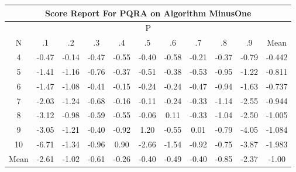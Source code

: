 \documentclass[11pt,a4paper]{report}
\begin{document}
\begin{longtable}{ | c || c | c | c | c | c | c | c | c | c || c |}
\hline
\multicolumn{11}{|c|}{ Score Report For PQRA on Algorithm MinusOne} \\
\hline
\multicolumn{11}{|c|}{ P } \\
\hline
N & .1 & .2 & .3 & .4 & .5 & .6 & .7 & .8 & .9 & Mean\\
 \hline
 \hline
 \endhead
  4 &  \cellcolor[HTML]{FFF7F7} -0.47 &  \cellcolor[HTML]{FFFFFF} -0.14 &  \cellcolor[HTML]{FFF7F7} -0.47 &  \cellcolor[HTML]{FFEFEF} -0.55 &  \cellcolor[HTML]{FFF7F7} -0.40 &  \cellcolor[HTML]{FFEFEF} -0.58 &  \cellcolor[HTML]{FFF7F7} -0.21 &  \cellcolor[HTML]{FFF7F7} -0.37 &  \cellcolor[HTML]{FFEFEF} -0.79 & -0.442 \\
  5 &  \cellcolor[HTML]{FFDFDF} -1.41 &  \cellcolor[HTML]{FFDFDF} -1.16 &  \cellcolor[HTML]{FFEFEF} -0.76 &  \cellcolor[HTML]{FFF7F7} -0.37 &  \cellcolor[HTML]{FFEFEF} -0.51 &  \cellcolor[HTML]{FFF7F7} -0.38 &  \cellcolor[HTML]{FFEFEF} -0.53 &  \cellcolor[HTML]{FFE7E7} -0.95 &  \cellcolor[HTML]{FFDFDF} -1.22 & -0.811 \\
  6 &  \cellcolor[HTML]{FFD7D7} -1.47 &  \cellcolor[HTML]{FFE7E7} -1.08 &  \cellcolor[HTML]{FFF7F7} -0.41 &  \cellcolor[HTML]{FFFFFF} -0.15 &  \cellcolor[HTML]{FFF7F7} -0.24 &  \cellcolor[HTML]{FFF7F7} -0.24 &  \cellcolor[HTML]{FFF7F7} -0.47 &  \cellcolor[HTML]{FFE7E7} -0.94 &  \cellcolor[HTML]{FFD7D7} -1.63 & -0.737 \\
  7 &  \cellcolor[HTML]{FFCFCF} -2.03 &  \cellcolor[HTML]{FFDFDF} -1.24 &  \cellcolor[HTML]{FFEFEF} -0.68 &  \cellcolor[HTML]{FFF7F7} -0.16 &  \cellcolor[HTML]{FFFFFF} -0.11 &  \cellcolor[HTML]{FFF7F7} -0.24 &  \cellcolor[HTML]{FFF7F7} -0.33 &  \cellcolor[HTML]{FFDFDF} -1.14 &  \cellcolor[HTML]{FFBFBF} -2.55 & -0.944 \\
  8 &  \cellcolor[HTML]{FFAFAF} -3.12 &  \cellcolor[HTML]{FFE7E7} -0.98 &  \cellcolor[HTML]{FFEFEF} -0.59 &  \cellcolor[HTML]{FFEFEF} -0.55 &  \cellcolor[HTML]{FFFFFF} -0.06 &  \cellcolor[HTML]{FFFFFF} 0.11 &  \cellcolor[HTML]{FFF7F7} -0.33 &  \cellcolor[HTML]{FFE7E7} -1.04 &  \cellcolor[HTML]{FFBFBF} -2.50 & -1.005 \\
  9 &  \cellcolor[HTML]{FFAFAF} -3.05 &  \cellcolor[HTML]{FFDFDF} -1.21 &  \cellcolor[HTML]{FFF7F7} -0.40 &  \cellcolor[HTML]{FFE7E7} -0.92 &  \cellcolor[HTML]{DFDFFF} 1.20 &  \cellcolor[HTML]{FFEFEF} -0.55 &  \cellcolor[HTML]{FFFFFF} 0.01 &  \cellcolor[HTML]{FFEFEF} -0.79 &  \cellcolor[HTML]{FF9797} -4.05 & -1.084 \\
  10 &  \cellcolor[HTML]{FF5858} -6.71 &  \cellcolor[HTML]{FFDFDF} -1.34 &  \cellcolor[HTML]{FFE7E7} -0.96 &  \cellcolor[HTML]{E7E7FF} 0.90 &  \cellcolor[HTML]{FFBFBF} -2.66 &  \cellcolor[HTML]{FFD7D7} -1.54 &  \cellcolor[HTML]{FFE7E7} -0.92 &  \cellcolor[HTML]{FFEFEF} -0.75 &  \cellcolor[HTML]{FF9F9F} -3.87 & -1.983 \\
 \hline
 \hline
Mean &  \cellcolor[HTML]{FFBFBF} -2.61 &  \cellcolor[HTML]{FFE7E7} -1.02 &  \cellcolor[HTML]{FFEFEF} -0.61 &  \cellcolor[HTML]{FFF7F7} -0.26 &  \cellcolor[HTML]{FFF7F7} -0.40 &  \cellcolor[HTML]{FFEFEF} -0.49 &  \cellcolor[HTML]{FFF7F7} -0.40 &  \cellcolor[HTML]{FFE7E7} -0.85 &  \cellcolor[HTML]{FFC7C7} -2.37 &  \cellcolor[HTML]{FFE7E7} -1.00
\end{longtable}
\end{document}
